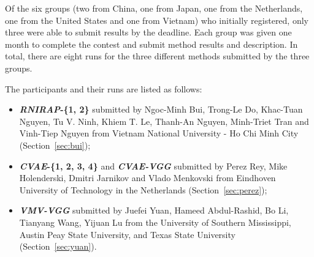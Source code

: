 \documentclass[../main.tex]{subfiles}
\begin{document}
Of the six groups (two from China, one from Japan, one from the Netherlands, one from the United States and one from Vietnam) who initially registered, only three were able to submit results by the deadline. Each group was given one month to complete the contest and  submit method results and description. In total, there are eight runs for the three different methods submitted by the three groups. 

The participants and their runs are listed as follows:

\begin{itemize}
	
	
	\item  \textbf{\textit{RNIRAP}-\{1, 2\}} submitted by 
	Ngoc-Minh Bui, Trong-Le Do, Khac-Tuan Nguyen, Tu V. Ninh, 
	Khiem T. Le, Thanh-An Nguyen, Minh-Triet Tran and Vinh-Tiep 
	Nguyen from Vietnam National University - Ho Chi Minh City 
	(Section~\ref{sec:bui});
	
	
	\item  \textbf{\textit{CVAE}-\{1, 2, 3, 4\} } and 
	\textbf{\textit{CVAE-VGG}} submitted by Perez Rey, 
	Mike Holenderski, Dmitri Jarnikov and Vlado Menkovski 
	from Eindhoven University of Technology in the 
	Netherlands (Section~\ref{sec:perez});
	

	\item  \textbf{\textit{VMV-VGG}} submitted by Juefei Yuan, Hameed Abdul-Rashid, Bo Li, Tianyang Wang, Yijuan Lu from the University of Southern Mississippi, Austin Peay State University, and Texas State University (Section~\ref{sec:yuan}).
	
\end{itemize}
\end{document}
